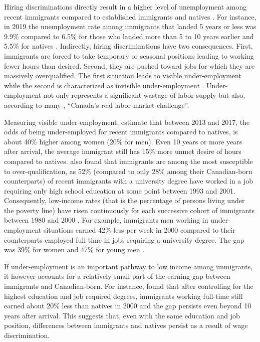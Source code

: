 \vspace{0.7em}\par
Hiring discriminations directly result in a higher level of unemployment among recent immigrants compared to established immigrants and natives \citep{Oreopoulos:2011jv}.
For instance, in 2019 the unemployment rate among immigrants that landed 5 years or less was 9.9\% compared to 6.5\% for those who landed more than 5 to 10 years earlier and 5.5\% for natives \citep{statCan:002}.
Indirectly, hiring discriminations have two consequences.
First, immigrants are forced to take temporary or seasonal positions leading to working fewer hours than desired.
Second, they are pushed toward jobs for which they are massively overqualified.
The first situation leads to visible under-employment while the second is characterized as invisible under-employment \citep{ilo:1982icls}.
Under-employment not only represents a significant wastage of labor supply \citep{Mitchell:2008wo} but also, according to many \citep{CanadianLabourCongress:2014wi,Li:2006uu}, ``Canada's real labor market challenge''.

\vspace{0.7em}\par
Measuring visible under-employment, \citet{gilbert:2020b} estimate that between 2013 and 2017, the odds of being under-employed for recent immigrants compared to natives, is about 40\% higher among women (20\% for men).
Even 10 years or more years after arrival, the average immigrant still has 15\% more unmet desire of hours compared to natives.
\citet{Li:2006uu} also found that immigrants are among the most susceptible to over-qualification, as 52\% (compared to only 28\% among their Canadian-born counterparts) of recent immigrants with a university degree have worked in a job requiring only high school education at some point between 1993 and 2001.
Consequently, low-income rates (that is the percentage of persons living under the poverty line) have risen continuously for each successive cohort of immigrants between 1980 and 2000  \citep{picot2003rise}.
For example, immigrants men working in under-employment situations earned 42\% less per week in 2000 compared to their counterparts employed full time in jobs requiring a university degree.
The gap was 39\% for women and 47\% for young men \citep{Morissette:wh}.

\vspace{0.7em}\par
If under-employment is an important pathway to low income among immigrants, it however accounts for a relatively small part of the earning gap between immigrants and Canadian-born.
For instance, \citet{Morissette:wh} found that after controlling for the highest education and job required degrees, immigrants working full-time still earned about 20\% less than natives in 2000 and the gap persists even beyond 10 years after arrival.
This suggests that, even with the same education and job position, differences between immigrants and natives persist as a result of wage discrimination.

